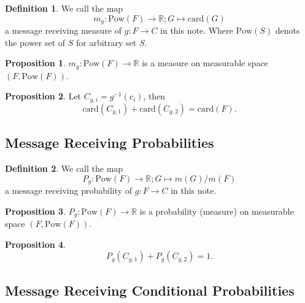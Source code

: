 \documentclass[11pt, a4note]{article}
\theoremstyle{definition}
\newtheorem{definition}{Definition}[section]
\newtheorem{proposition}{Proposition}[section]
\begin{document}
\begin{definition}
We call the map
\begin{equation}
m_{g} : \mathrm{Pow}(F) \to \mathbb{R} ; G \mapsto \mathrm{card}(G)
\end{equation}
a message receiving measure of $ g : F \to C $ in this note.
Where $ \mathrm{Pow}(S) $ denots the power set of $ S $ for arbitrary set $ S $.
\end{definition}

\begin{proposition}
$ m_{g} : \mathrm{Pow}(F) \to \mathbb{R} $ is a measure on measurable space $ (F, \mathrm{Pow}(F)) $.
\end{proposition}

\begin{proposition}
Let $ C_{g,i} = g^{-1}(c_{i}) $, then
\begin{equation}
\mathrm{card}(C_{g,1}) + \mathrm{card}(C_{g,2}) = \mathrm{card}(F).
\end{equation}
\end{proposition}

\subsection{Message Receiving Probabilities}

\begin{definition}
We call the map
\begin{equation}
P_{g} : \mathrm{Pow}(F) \to \mathbb{R} ; G \mapsto m(G)/m(F)
\end{equation}
a message receiving probability of $ g : F \to C $ in this note.
\end{definition}

\begin{proposition}
$ P_{g} : \mathrm{Pow}(F) \to \mathbb{R} $ is a probability (measure) on measurable space $ (F, \mathrm{Pow}(F)) $.
\end{proposition}

\begin{proposition}
\begin{equation}
P_{g}(C_{g,1}) + P_{g}(C_{g,2}) = 1.
\end{equation}
\end{proposition}

\subsection{Message Receiving Conditional Probabilities}
\end{document}

